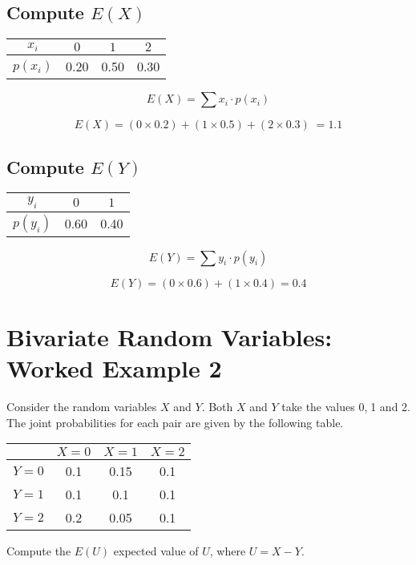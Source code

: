 \documentclass[a4paper,12pt]{article}
\begin{document}
\subsection*{Compute $E(X)$}
\begin{center}
\begin{tabular}{|c|c|c|c|}
\hline $x_i$ & $0$ & $1$ & $2$  \\ 
\hline $p(x_i)$& 0.20 & 0.50 & 0.30 \\
\hline 
\end{tabular} 
\end{center}


\[ E(X) =  \sum  x_i \cdot p(x_i)   \]

\[E(X) =(0\times 0.2) + (1 \times 0.5) + (2 \times 0.3)\;  = 1.1\]

\subsection*{Compute $E(Y)$}

\begin{center}
\begin{tabular}{|c|c|c|}
\hline $y_i$ & $0$ & $1$  \\ 
\hline $p(y_i)$& 0.60 & 0.40 \\
\hline 
\end{tabular} 
\end{center}

\[ E(Y) =  \sum  y_i \cdot p(y_i)   \]



\[ E(Y) = (0 \times 0.6) +  (1 \times 0.4)  =0.4 \]



\newpage
\section*{Bivariate Random Variables: Worked Example 2}
Consider the random variables $X$ and $Y$. Both $X$ and $Y$ take the values 0,$\;$1 and 2. 
The joint probabilities for each pair are given by the following table.
\begin{center}
\begin{tabular}{|c|c|c|c|}
\hline  & $X=0$ & $X=1$ & $X=2$ \\ 
\hline $Y=0$ & 0.1 & 0.15 & 0.1 \\ 
\hline $Y=1$ & 0.1 & 0.1 & 0.1 \\ 
\hline $Y=2$ & 0.2 & 0.05 & 0.1 \\ 
\hline 
\end{tabular} 
\end{center}
Compute the $E(U)$ expected value of $U$, where $U=X-Y$.
\end{document}
